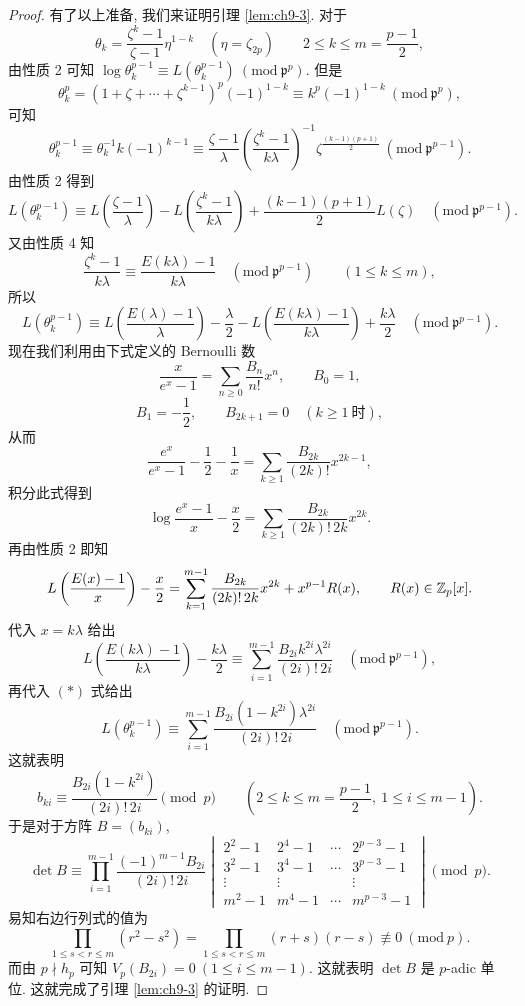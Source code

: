 \begin{proof}
有了以上准备, 我们来证明引理 \ref{lem:ch9-3}. 对于
\[
  \theta_k=\frac{\zeta^k-1}{\zeta-1}\eta^{1-k}\quad(\eta=\zeta_{2p})\qquad
  2\leqslant k\leqslant m=\frac{p-1}{2},
\]
由性质 2 可知 $\log\theta_k^{p-1}\equiv L(\theta_k^{p-1})\ (\mathrm{mod}\ \mathfrak{p}^p)$. 但是
\[
  \theta_k^p=(1+\zeta+\cdots+\zeta^{k-1})^p(-1)^{1-k}
  \equiv k^p(-1)^{1-k}\ (\mathrm{mod}\ \mathfrak{p}^p),
\]
可知
\[
  \theta_k^{p-1}\equiv\theta_k^{-1}k(-1)^{k-1}
  \equiv\frac{\zeta-1}{\lambda}\left(\frac{\zeta^k-1}{k\lambda}\right)^{-1}
  \zeta^{\frac{(k-1)(p+1)}{2}}\ (\mathrm{mod}\ \mathfrak{p}^{p-1}).
\]
由性质 2 得到
\[
  L(\theta_k^{p-1})\equiv L\left(\frac{\zeta-1}{\lambda}\right)
  -L\left(\frac{\zeta^k-1}{k\lambda}\right)
  +\frac{(k-1)(p+1)}{2}L(\zeta)\quad(\mathrm{mod}\ \mathfrak{p}^{p-1}).
\]
又由性质 4 知
\[
  \frac{\zeta^k-1}{k\lambda}\equiv\frac{E(k\lambda)-1}{k\lambda}
  \quad(\mathrm{mod}\ \mathfrak{p}^{p-1})\qquad(1\leqslant k\leqslant m),
\]
所以
\begin{equation}\tag{*}
  L(\theta_k^{p-1})\equiv L\left(\frac{E(\lambda)-1}{\lambda}\right)
  -\frac{\lambda}{2}-L\left(\frac{E(k\lambda)-1}{k\lambda}\right)
  +\frac{k\lambda}{2}\quad(\mathrm{mod}\ \mathfrak{p}^{p-1}).
\end{equation}
现在我们利用由下式定义的 Bernoulli 数
\[
  \frac{x}{e^x-1}=\sum_{n\geqslant 0}\frac{B_n}{n!}x^n,\qquad B_0=1,
\]
\[
  B_1=-\frac{1}{2},\qquad B_{2k+1}=0\quad(k\geqslant 1\ \text{时}),
\]
从而
\[
  \frac{e^x}{e^x-1}-\frac{1}{2}-\frac{1}{x}
  =\sum_{k\geqslant 1}\frac{B_{2k}}{(2k)!}x^{2k-1},
\]
积分此式得到
\[
  \log\frac{e^x-1}{x}-\frac{x}{2}
  =\sum_{k\geqslant 1}\frac{B_{2k}}{(2k)!\,2k}x^{2k}.
\]
再由性质 2 即知
\[
  L\left(\frac{E(x)-1}{x}\right)-\frac{x}{2}
  =\sum_{k=1}^{m-1}\frac{B_{2k}}{(2k)!\,2k}x^{2k}+x^{p-1}R(x),
  \qquad R(x)\in\mathbb{Z}_p[x].
\]
代入 $x=k\lambda$ 给出
\[
  L\left(\frac{E(k\lambda)-1}{k\lambda}\right)-\frac{k\lambda}{2}
  \equiv\sum_{i=1}^{m-1}\frac{B_{2i}k^{2i}\lambda^{2i}}{(2i)!\,2i}
  \quad(\mathrm{mod}\ \mathfrak{p}^{p-1}),
\]
再代入 $(*)$ 式给出
\[
  L(\theta_k^{p-1})\equiv\sum_{i=1}^{m-1}\frac{B_{2i}(1-k^{2i})\lambda^{2i}}{(2i)!\,2i}
  \quad(\mathrm{mod}\ \mathfrak{p}^{p-1}).
\]
这就表明
\[
  b_{ki}\equiv\frac{B_{2i}(1-k^{2i})}{(2i)!\,2i}\pmod{p}
  \qquad(2\leqslant k\leqslant m=\frac{p-1}{2},\ 1\leqslant i\leqslant m-1).
\]
于是对于方阵 $B=(b_{ki})$,
\[
  \det B\equiv\prod_{i=1}^{m-1}\frac{(-1)^{m-1}B_{2i}}{(2i)!\,2i}
  \begin{vmatrix}
    2^2-1 & 2^4-1 & \cdots & 2^{p-3}-1\\
    3^2-1 & 3^4-1 & \cdots & 3^{p-3}-1\\
    \vdots & \vdots & & \vdots\\
    m^2-1 & m^4-1 & \cdots & m^{p-3}-1
  \end{vmatrix}\pmod{p}.
\]
易知右边行列式的值为
\[
  \prod_{1\leqslant s<r\leqslant m}(r^2-s^2)
  =\prod_{1\leqslant s<r\leqslant m}(r+s)(r-s)\not\equiv 0\ (\mathrm{mod}\ p).
\]
而由 $p\nmid h_p$ 可知 $V_p(B_{2i})=0\ (1\leqslant i\leqslant m-1)$. 这就表明 $\det B$ 是 $p$-adic 单位. 这就完成了引理 \ref{lem:ch9-3} 的证明.
\end{proof}

